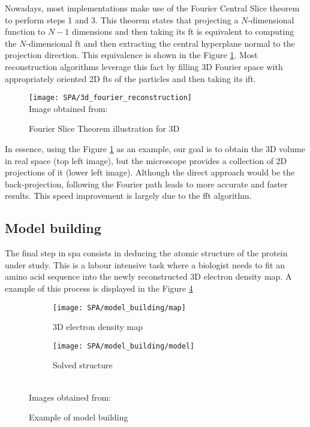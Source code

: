 \documentclass[../main.tex]{subfiles}
\begin{document}
Nowadays, most implementations make use of the Fourier Central Slice theorem to perform steps 1 and 3. This theorem states that projecting a $N$-dimensional function to $N-1$ dimensions and then taking its \gls{ft} is equivalent to computing the $N$-dimensional \gls{ft} and then extracting the central hyperplane normal to the projection direction. This equivalence is shown in the Figure \ref{fig:2:3dfourier}. Most reconstruction algorithms leverage this fact by filling 3D Fourier space with appropriately oriented 2D \glspl{ft} of the particles and then taking its \gls{ift}.

\begin{figure}[htbp]
    \centering
    \texttt{[image: SPA/3d\_fourier\_reconstruction]}\\
    Image obtained from: \cite{nogales2015}
    \caption{Fourier Slice Theorem illustration for 3D}
    \label{fig:2:3dfourier}
\end{figure}

In essence, using the Figure \ref{fig:2:3dfourier} as an example, our goal is to obtain the 3D volume in real space (top left image), but the microscope provides a collection of 2D projections of it (lower left image). Although the direct approach would be the back-projection, following the Fourier path leads to more accurate and faster results. This speed improvement is largely due to the \gls{fft} algorithm.

\subsection{Model building}
The final step in \gls{spa} consists in deducing the atomic structure of the protein under study. This is a labour intensive task where a biologist needs to fit an amino acid sequence into the newly reconstructed 3D electron density map. A example of this process is displayed in the Figure \ref{fig:2:model_building}

\begin{figure}[htbp]
    \centering
    \begin{subfigure}[b]{0.3\textwidth}
         \centering
         \texttt{[image: SPA/model\_building/map]}
         \caption{3D electron density map}
         \label{fig:2:model_building:map}
    \end{subfigure}
    \begin{subfigure}[b]{0.3\textwidth}
         \centering
         \texttt{[image: SPA/model\_building/model]}
         \caption{Solved structure}
         \label{fig:2:model_building:model}
    \end{subfigure}\\
    Images obtained from: \cite{pfab2020}
    \caption{Example of model building}
    \label{fig:2:model_building}
\end{figure}
\end{document}
